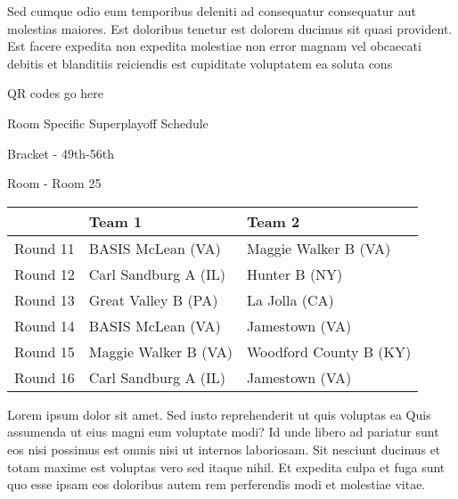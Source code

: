 \documentclass{article}%
\begin{document}
\newline%
    Sed cumque odio eum temporibus deleniti ad consequatur consequatur aut molestias maiores. Est doloribus tenetur est dolorem ducimus sit quasi provident. Est facere expedita non expedita molestiae non error magnam vel obcaecati debitis et blanditiis reiciendis est cupiditate voluptatem ea soluta cons%
\vspace*{140pt}%
\begin{center}%
\begin{Huge}%
QR codes go here%
\end{Huge}%
\end{center}%
\newpage%
\begin{center}%
\begin{Huge}%
Room Specific Superplayoff Schedule%
\end{Huge}%
\vspace*{8pt}%
\linebreak%
\begin{Large}%
Bracket {-} 49th{-}56th%
\end{Large}%
\vspace*{8pt}%
\linebreak%
\vspace*{8pt}%
\begin{Large}%
Room {-} Room 25%
\end{Large}%
\end{center}%
%
\begin{tabularx}{\textwidth}{|c|Y|Y|}%
\hline%
&Team 1&Team 2\\%
\hline%
Round 11&BASIS McLean (VA)&Maggie Walker B (VA)\\%
Round 12&Carl Sandburg A (IL)&Hunter B (NY)\\%
Round 13&Great Valley B (PA)&La Jolla (CA)\\%
Round 14&BASIS McLean (VA)&Jamestown (VA)\\%
Round 15&Maggie Walker B (VA)&Woodford County B (KY)\\%
Round 16&Carl Sandburg A (IL)&Jamestown (VA)\\%
\hline%
\end{tabularx}%
\vspace*{8pt}%
\newline%
    Lorem ipsum dolor sit amet. Sed iusto reprehenderit ut quis voluptas ea Quis assumenda ut eius magni eum voluptate modi? Id unde libero ad pariatur sunt eos nisi possimus est omnis nisi ut internos laboriosam. Sit nesciunt ducimus et totam maxime est voluptas vero sed itaque nihil. Et expedita culpa et fuga sunt quo esse ipsam eos doloribus autem rem perferendis modi et molestiae vitae.\newline%
\end{document}
